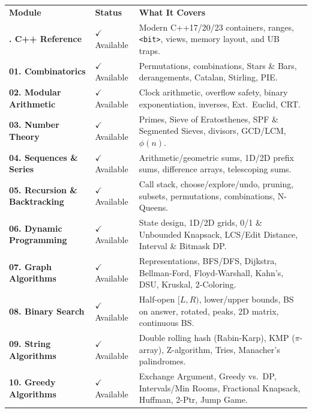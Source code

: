 \documentclass[11pt,a4paper]{article}
\begin{document}
\begingroup\footnotesize{}
\begin{tabularx}{\textwidth}{>{\raggedright\arraybackslash\bfseries}p{4.2cm} >{\centering\arraybackslash}p{1.9cm} >{\raggedright\arraybackslash}X}
\arrayrulecolor{primaryblue}\toprule[1.2pt]
\rowcolor{primaryblue!10}
\textcolor{primaryblue}{\textbf{Module}} & \textcolor{primaryblue}{\textbf{Status}} & \textcolor{primaryblue}{\textbf{What It Covers}} \\
\arrayrulecolor{codeframe}\midrule[0.6pt]
00. C++ Reference & \color{codegreen}$\checkmark$ Available & Modern C++17/20/23 containers, ranges, \texttt{<bit>}, views, memory layout, and UB traps. \\
01. Combinatorics & \color{codegreen}$\checkmark$ Available & Permutations, combinations, Stars \& Bars, derangements, Catalan, Stirling, PIE. \\
02. Modular Arithmetic & \color{codegreen}$\checkmark$ Available & Clock arithmetic, overflow safety, binary exponentiation, inverses, Ext.\ Euclid, CRT. \\
03. Number Theory & \color{codegreen}$\checkmark$ Available & Primes, Sieve of Eratosthenes, SPF \& Segmented Sieves, divisors, GCD/LCM, $\phi(n)$. \\
04. Sequences \& Series & \color{codegreen}$\checkmark$ Available & Arithmetic/geometric sums, 1D/2D prefix sums, difference arrays, telescoping sums. \\
05. Recursion \& Backtracking & \color{codegreen}$\checkmark$ Available & Call stack, choose/explore/undo, pruning, subsets, permutations, combinations, N-Queens. \\
06. Dynamic Programming & \color{codegreen}$\checkmark$ Available & State design, 1D/2D grids, 0/1 \& Unbounded Knapsack, LCS/Edit Distance, Interval \& Bitmask DP. \\
07. Graph Algorithms & \color{codegreen}$\checkmark$ Available & Representations, BFS/DFS, Dijkstra, Bellman-Ford, Floyd-Warshall, Kahn's, DSU, Kruskal, 2-Coloring. \\
08. Binary Search & \color{codegreen}$\checkmark$ Available & Half-open $[L, R)$, lower/upper bounds, BS on answer, rotated, peaks, 2D matrix, continuous BS. \\
09. String Algorithms & \color{codegreen}$\checkmark$ Available & Double rolling hash (Rabin-Karp), KMP ($\pi$-array), Z-algorithm, Tries, Manacher's palindromes. \\
10. Greedy Algorithms & \color{codegreen}$\checkmark$ Available & Exchange Argument, Greedy vs.\ DP, Intervals/Min Rooms, Fractional Knapsack, Huffman, 2-Ptr, Jump Game. \\

\end{tabularx}
\end{document}
